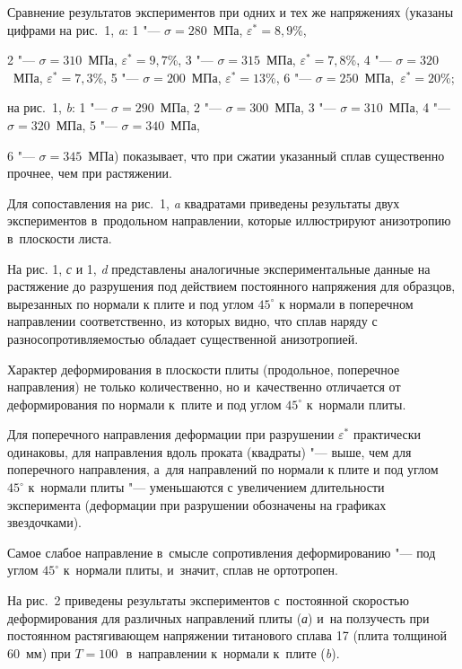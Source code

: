 Сравнение результатов экспериментов при одних и тех же напряжениях (указаны цифрами на рис.~1, {\sl a}: 1 "--- $\sigma=280$~МПа, $\varepsilon^*=8,9$\%,

2 "--- $\sigma=310$~МПа, $\varepsilon^*=9,7$\%,  3 "--- $\sigma=315$~МПа, $\varepsilon^*=7,8$\%, 4 "--- $\sigma=320$~МПа, $\varepsilon^*=7,3$\%, 5 "--- $\sigma=200$~МПа, $\varepsilon^*=13$\%, 6 "--- \mbox{$\sigma=250$~МПа, $\varepsilon^*=20$\%};

на рис.~1, {\sl b}: 1 "--- $\sigma=290$~МПа, 2 "--- $\sigma=300$~МПа, 3 "--- $\sigma=310$~МПа, 4 "--- $\sigma=320$~МПа, 5 "--- $\sigma=340$~МПа,

6 "--- $\sigma=345$~МПа) показывает, что при сжатии указанный сплав существенно прочнее, чем при растяжении.

Для сопоставления на рис.~1, {\sl a} квадратами приведены результаты двух экспериментов в~продольном направлении, которые иллюстрируют анизотропию в~плоскости листа.



На рис. 1, {\sl с} и 1, {\sl d} представлены аналогичные экспериментальные данные на растяжение до разрушения под действием постоянного напряжения для образцов, вырезанных по нормали к плите и под углом $45^{\circ}$  к нормали в поперечном направлении соответственно, из которых видно, что сплав наряду с разносопротивляемостью обладает существенной анизотропией.

Характер деформирования в плоскости плиты (продольное, поперечное направления) не только количественно, но и~качественно отличается от деформирования по нормали к~плите и под углом $45^{\circ}$ к~нормали плиты.

Для поперечного направления деформации при разрушении  $\varepsilon^{*}$ практически одинаковы, для направления вдоль проката (квадраты) "--- выше, чем для поперечного направления, а~для направлений по нормали к плите и под углом $45^{\circ}$  к~нормали плиты "--- уменьшаются с увеличением длительности эксперимента (деформации при разрушении обозначены на графиках звездочками).

Самое слабое направление в~смысле сопротивления деформированию "--- под углом $45^{\circ}$  к~нормали плиты, и~значит, сплав не ортотропен.



На рис.~2 приведены результаты экспериментов с~постоянной скоростью деформирования для различных направлений плиты ({\sl а}) и~на ползучесть при постоянном растягивающем напряжении титанового сплава 17 (плита толщиной 60~мм) при $T=100$\,\textcelsius \  в~направлении к~нормали к~плите ({\sl b}).





